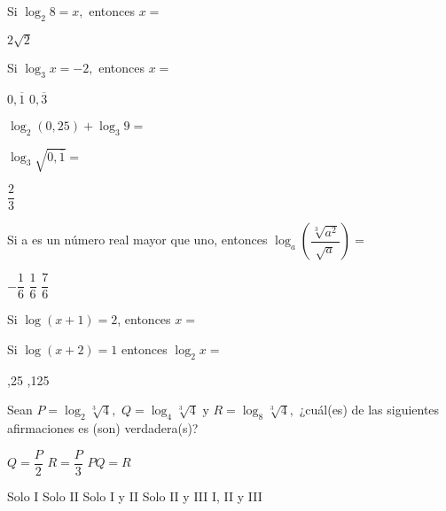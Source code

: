 \documentclass[pagina vacia]{srs}
\begin{document}
\begin{preguntas}
\pregunta Si $\log_{2}8=x,$ entonces $x=$
\begin{vertical}
\alternativa $2\sqrt{2}$
\end{vertical}

\pregunta Si $\log_{3}x=-2,$ entonces $x=$
\begin{vertical}
\alternativa $0,\overline{1}$
\alternativa $0,\overline{3}$
\end{vertical}

\pregunta $\log_{2}\left(0,25\right)+\log_{3}9=$
\begin{vertical}
\end{vertical}

\pregunta $\log_{3}\sqrt{0,\overline{1}}=$
\begin{vertical}
\alternativa $\dfrac{2}{3}$
\end{vertical}

\pregunta Si a es un número real mayor que uno, entonces $\log_{a}\left(\dfrac{\sqrt[3]{a^{2}}}{\sqrt{a}}\right)=$
\begin{vertical}
\alternativa $-\dfrac{1}{6}$
\alternativa $\dfrac{1}{6}$
\alternativa $\dfrac{7}{6}$
\end{vertical}

\pregunta Si $\log\left(x+1\right)=2$, entonces $x=$
\begin{vertical}
\end{vertical}

\pregunta Si $\log\left(x+2\right)=1$ entonces $\log_{2}x=$
\begin{vertical}
,25
,125
\end{vertical}

\pregunta Sean $P=\log_{2}\sqrt[3]{4},$ $Q=\log_{4}\sqrt[3]{4} \text{ y } R=\log_{8}\sqrt[3]{4},$ ¿cuál(es) de las siguientes afirmaciones es (son) verdadera(s)?
\begin{verticali}
\alternativa $Q=\dfrac{P}{2}$
\alternativa $R=\dfrac{P}{3}$
\alternativa $PQ=R$
\end{verticali}
\begin{vertical}
\alternativa Solo I
\alternativa Solo II
\alternativa Solo I y II
\alternativa Solo II y III
\alternativa I, II y III
\end{vertical}


\end{preguntas}
\end{document}
